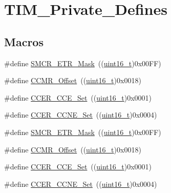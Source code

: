 \hypertarget{group___t_i_m___private___defines}{}\section{T\+I\+M\+\_\+\+Private\+\_\+\+Defines}
\label{group___t_i_m___private___defines}
\subsection*{Macros}
\begin{DoxyCompactItemize}
\item 
\#define \hyperlink{group___t_i_m___private___defines_ga43819484b70fd8f2f2aa02d4131c9841}{S\+M\+C\+R\+\_\+\+E\+T\+R\+\_\+\+Mask}~((\hyperlink{_p_e___types_8h_a1f1825b69244eb3ad2c7165ddc99c956}{uint16\+\_\+t})0x00\+F\+F)
\item 
\#define \hyperlink{group___t_i_m___private___defines_ga76469c9f56da4e7705336a6ac0248196}{C\+C\+M\+R\+\_\+\+Offset}~((\hyperlink{_p_e___types_8h_a1f1825b69244eb3ad2c7165ddc99c956}{uint16\+\_\+t})0x0018)
\item 
\#define \hyperlink{group___t_i_m___private___defines_ga17c4ed624aa62f19fd496c3f3bd61137}{C\+C\+E\+R\+\_\+\+C\+C\+E\+\_\+\+Set}~((\hyperlink{_p_e___types_8h_a1f1825b69244eb3ad2c7165ddc99c956}{uint16\+\_\+t})0x0001)
\item 
\#define \hyperlink{group___t_i_m___private___defines_ga167dfdf613827d1fdf2e4152497b4bd5}{C\+C\+E\+R\+\_\+\+C\+C\+N\+E\+\_\+\+Set}~((\hyperlink{_p_e___types_8h_a1f1825b69244eb3ad2c7165ddc99c956}{uint16\+\_\+t})0x0004)
\item 
\#define \hyperlink{group___t_i_m___private___defines_ga43819484b70fd8f2f2aa02d4131c9841}{S\+M\+C\+R\+\_\+\+E\+T\+R\+\_\+\+Mask}~((\hyperlink{_p_e___types_8h_a1f1825b69244eb3ad2c7165ddc99c956}{uint16\+\_\+t})0x00\+F\+F)
\item 
\#define \hyperlink{group___t_i_m___private___defines_ga76469c9f56da4e7705336a6ac0248196}{C\+C\+M\+R\+\_\+\+Offset}~((\hyperlink{_p_e___types_8h_a1f1825b69244eb3ad2c7165ddc99c956}{uint16\+\_\+t})0x0018)
\item 
\#define \hyperlink{group___t_i_m___private___defines_ga17c4ed624aa62f19fd496c3f3bd61137}{C\+C\+E\+R\+\_\+\+C\+C\+E\+\_\+\+Set}~((\hyperlink{_p_e___types_8h_a1f1825b69244eb3ad2c7165ddc99c956}{uint16\+\_\+t})0x0001)
\item 
\#define \hyperlink{group___t_i_m___private___defines_ga167dfdf613827d1fdf2e4152497b4bd5}{C\+C\+E\+R\+\_\+\+C\+C\+N\+E\+\_\+\+Set}~((\hyperlink{_p_e___types_8h_a1f1825b69244eb3ad2c7165ddc99c956}{uint16\+\_\+t})0x0004)
\end{DoxyCompactItemize}


